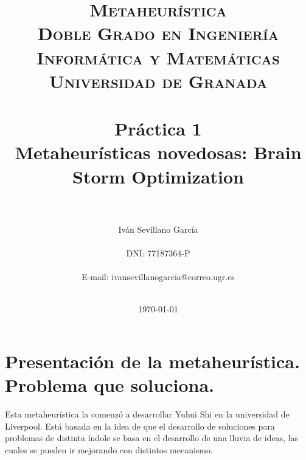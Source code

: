 


\title{	
\normalfont \normalsize 
\textsc{\textbf{Metaheurística} \\ Doble Grado en Ingeniería Informática y Matemáticas \\ Universidad de Granada} \\ [25pt] %
\horrule{0.5pt} \\[0.4cm] %
\Huge Práctica 1\\
\LARGE Metaheurísticas novedosas: Brain Storm Optimization
 \\ %
\horrule{2pt} \\[0.5cm] %
}

\author{ Iván Sevillano García \\\\
	DNI: 77187364-P\\ \\
	E-mail: ivansevillanogarcia@correo.ugr.es\\\\
	} %

\date{\normalsize\today} %




\maketitle %

\newpage

\tableofcontents
\newpage

\section{Presentación de la metaheurística. Problema que soluciona.}

Esta metaheurística la comenzó a desarrollar Yuhui Shi en la universidad de Liverpool\cite{BSO}. Está basada en la idea de que el desarrollo de soluciones para problemas de distinta índole se basa en el desarrollo de una lluvia de ideas, las cuales se pueden ir mejorando con distintos mecanismo. \\

